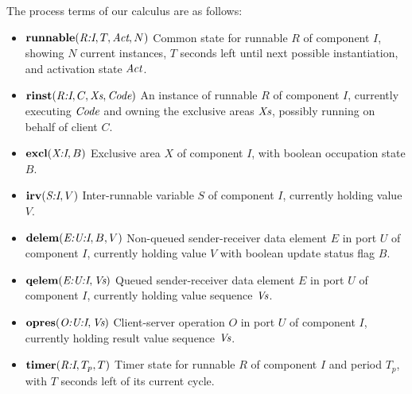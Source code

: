 \documentclass[twocolumn]{article}
\newcommand{\V}[1]{\mbox{\it #1}}
\newcommand{\Code}{\V{Code}}
\newcommand{\Act}{\V{Act}}
\newcommand{\Xs}{\V{Xs}}
\newcommand{\Vs}{\V{Vs}}
\newcommand{\adr}[1]{\mbox{\em #1}}
\newcommand{\runnable}[4]{\mbox{\bf runnable}(#1,#2,#3,#4)}
\newcommand{\rinst}[4]{\mbox{\bf rinst}(#1,#2,#3,#4)}
\newcommand{\excl}[2]{\mbox{\bf excl}(#1,#2)}
\newcommand{\irv}[2]{\mbox{\bf irv}(#1,#2)}
\newcommand{\qelem}[2]{\mbox{\bf qelem}(#1,#2)}
\newcommand{\delem}[3]{\mbox{\bf delem}(#1,#2,#3)}
\newcommand{\opres}[2]{\mbox{\bf opres}(#1,#2)}
\newcommand{\timer}[3]{\mbox{\bf timer}(#1,#2, #3)}
\begin{document}
The process terms of our calculus are as follows:
\begin{itemize}
\item $\runnable{\adr{R:I}}{T}{\Act}{N}$  \newline
Common state for runnable $R$ of component $I$, showing $N$ current instances, $T$ seconds left until next possible instantiation, and activation state $\Act$.
\item $\rinst{\adr{R:I}}{C}{\Xs}{\Code}$ \newline
An instance of runnable $R$ of component $I$, currently executing $\Code$ and owning the exclusive areas $\Xs$, possibly running on behalf of client $C$.
\item $\excl{\adr{X:I}}{B}$ \newline
Exclusive area $X$ of component $I$, with boolean occupation state $B$.
\item $\irv{\adr{S:I}}{V}$ \newline
Inter-runnable variable $S$ of component $I$, currently holding value $V$.
\item $\delem{\adr{E:U:I}}{B}{V}$ \newline
Non-queued sender-receiver data element $E$ in port $U$ of component $I$, currently holding value $V$ with boolean update status flag $B$.
\item $\qelem{\adr{E:U:I}}{\Vs}$ \newline
Queued sender-receiver data element $E$ in port $U$ of component $I$, currently holding value sequence $\Vs$.
\item $\opres{\adr{O:U:I}}{\Vs}$ \newline
Client-server operation $O$ in port $U$ of component $I$, currently holding result value sequence $\Vs$.
\item $\timer{\adr{R:I}}{T_p}{T}$ \newline
Timer state for runnable $R$ of component $I$ and period $T_p$, with $T$ seconds left of its current cycle.
\end{itemize}
\end{document}
